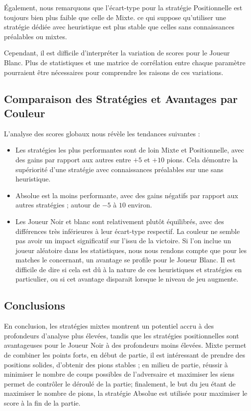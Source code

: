Également, nous remarquons que l'écart-type pour la stratégie Positionnelle est toujours bien plus faible que celle de Mixte. ce qui suppose qu'utiliser une stratégie dédiée avec heuristique est plus stable que celles sans connaissances préalables ou mixtes.

Cependant, il est difficile d'interpréter la variation de scores pour le Joueur Blanc. Plus de statistiques et une matrice de corrélation entre chaque paramètre pourraient être nécessaires pour comprendre les raisons de ces variations.

\subsection{Comparaison des Stratégies et Avantages par Couleur}

L'analyse des scores globaux nous révèle les tendances suivantes :

\begin{itemize}
    \item Les stratégies les plus performantes sont de loin Mixte et Positionnelle, avec des gains par rapport aux autres entre $+5$ et $+10$ pions. Cela démontre la supériorité d'une stratégie avec connaissances préalables sur une sans heuristique.
    \item Absolue est la moins performante, avec des gains négatifs par rapport aux autres stratégies ; autour de $-5$ à $10$ environ.
    \item Les Joueur Noir et blanc sont relativement plutôt équilibrés, avec des différences très inférieures à leur écart-type respectif. La couleur ne semble pas avoir un impact significatif sur l'issu de la victoire. Si l'on inclue un joueur aléatoire dans les statistiques, nous nous rendons compte que pour les matches le concernant, un avantage se profile pour le Joueur Blanc. Il est difficile de dire si cela est dû à la nature de ces  heuristiques et stratégies en particulier, ou si cet avantage disparait lorsque le niveau de jeu augmente.
\end{itemize}

\subsection*{Conclusions}

En conclusion, les stratégies mixtes montrent un potentiel accru à des profondeurs d'analyse plus élevées, tandis que les stratégies positionnelles sont avantageuses pour le Joueur Noir à des profondeurs moins élevées. Mixte permet de combiner les points forts, en début de partie, il est intéressant de prendre des positions solides, d'obtenir des pions stables ; en milieu de partie, réussir à minimiser le nombre de coups possibles de l'adversaire et maximiser les siens permet de contrôler le déroulé de la partie; finalement, le but du jeu étant de maximiser le nombre de pions, la stratégie Absolue est utilisée pour maximiser le score à la fin de la partie.